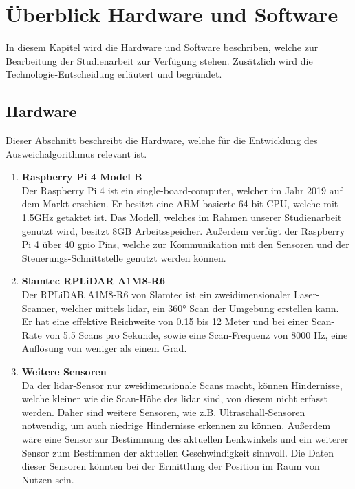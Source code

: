 \section{Überblick Hardware und Software}
In diesem Kapitel wird die Hardware und Software beschriben, welche zur Bearbeitung der Studienarbeit zur Verfügung stehen.
Zusätzlich wird die Technologie-Entscheidung erläutert und begründet.

\subsection{Hardware}
Dieser Abschnitt beschreibt die Hardware, welche für die Entwicklung des Ausweichalgorithmus relevant ist. 

\begin{enumerate}[leftmargin=*]
    \item \textbf{Raspberry Pi 4 Model B} \\
    Der Raspberry Pi 4 ist ein single-board-computer, welcher im Jahr 2019 auf dem Markt erschien. 
    Er besitzt eine ARM-basierte 64-bit CPU, welche mit 1.5GHz getaktet ist. Das Modell, welches im Rahmen unserer Studienarbeit genutzt wird, besitzt 8GB Arbeitsspeicher. 
    Außerdem verfügt der Raspberry Pi 4 über 40 \acf{gpio} Pins, welche zur Kommunikation mit den Sensoren und der Steuerungs-Schnittstelle genutzt werden können. \cite{RasPi2024}

    \item \textbf{Slamtec RPLiDAR A1M8-R6} \\
    Der RPLiDAR A1M8-R6 von Slamtec ist ein zweidimensionaler Laser-Scanner, welcher mittels \acf{lidar}, ein 360° Scan der Umgebung erstellen kann. \cite[p. 3]{Slamtec2020}
    Er hat eine effektive Reichweite von 0.15 bis 12 Meter und bei einer Scan-Rate von 5.5 Scans pro Sekunde, sowie eine Scan-Frequenz von 8000 Hz, eine Auflösung von weniger als einem Grad. \cite[p. 8]{Slamtec2020}
    
    \item \textbf{Weitere Sensoren} \\
    Da der \ac{lidar}-Sensor nur zweidimensionale Scans macht, können Hindernisse, welche kleiner wie die Scan-Höhe des \ac{lidar} sind, von diesem nicht erfasst werden. 
    Daher sind weitere Sensoren, wie z.B. Ultraschall-Sensoren notwendig, um auch niedrige Hindernisse erkennen zu können. 
    Außerdem wäre eine Sensor zur Bestimmung des aktuellen Lenkwinkels und ein weiterer Sensor zum Bestimmen der aktuellen Geschwindigkeit sinnvoll. 
    Die Daten dieser Sensoren könnten bei der Ermittlung der Position im Raum von Nutzen sein. 
\end{enumerate}

